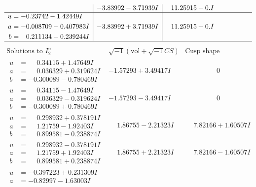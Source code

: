 \documentclass[1p]{elsarticle_modified}
\theoremstyle{definition}
\newcommand{\I}{\sqrt{-1}}
\begin{document}
$$\begin{array}{c|c|c}
 & -3.83992 - 3.71939 I & \phantom{-}11.25915 + 0. I\phantom{ +0.000000I} \\ \hline\begin{aligned}
u &= -0.23742 - 1.42449 I \\
a &= -0.008709 - 0.407983 I \\
b &= \phantom{-}0.211134 - 0.239244 I\end{aligned}
 & -3.83992 + 3.71939 I & \phantom{-}11.25915 + 0. I\phantom{ +0.000000I}\\
 \hline 
 \end{array}$$\newpage$$\begin{array}{c|c|c}  
\text{Solutions to }I^u_{2}& \I (\text{vol} + \sqrt{-1}CS) & \text{Cusp shape}\\
 \hline 
\begin{aligned}
u &= \phantom{-}0.34115 + 1.47649 I \\
a &= \phantom{-}0.036329 + 0.319624 I \\
b &= -0.300089 - 0.780469 I\end{aligned}
 & -1.57293 + 3.49417 I & \phantom{-0.000000 } 0 \\ \hline\begin{aligned}
u &= \phantom{-}0.34115 - 1.47649 I \\
a &= \phantom{-}0.036329 - 0.319624 I \\
b &= -0.300089 + 0.780469 I\end{aligned}
 & -1.57293 - 3.49417 I & \phantom{-0.000000 } 0 \\ \hline\begin{aligned}
u &= \phantom{-}0.298932 + 0.378191 I \\
a &= \phantom{-}1.21759 - 1.92403 I \\
b &= \phantom{-}0.899581 - 0.238874 I\end{aligned}
 & \phantom{-}1.86755 - 2.21323 I & \phantom{-}7.82166 + 1.60507 I \\ \hline\begin{aligned}
u &= \phantom{-}0.298932 - 0.378191 I \\
a &= \phantom{-}1.21759 + 1.92403 I \\
b &= \phantom{-}0.899581 + 0.238874 I\end{aligned}
 & \phantom{-}1.86755 + 2.21323 I & \phantom{-}7.82166 - 1.60507 I \\ \hline\begin{aligned}
u &= -0.397223 + 0.231309 I \\
a &= -0.82997 - 1.63003 I \\

\end{aligned}
\end{array}$$
\end{document}
